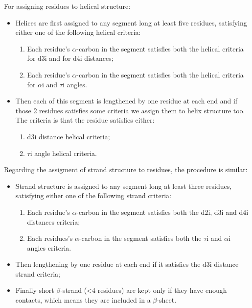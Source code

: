 For assigning residues to helical structure:
\begin{itemize}
    \item Helices are first assigned to any segment long at least five residues, satisfying either one of the following helical criteria:
        \begin{enumerate}
            \item Each residue's $\alpha$-carbon in the segment satisfies both the helical criteria for d3i and for d4i distances;
            \item Each residue's $\alpha$-carbon in the segment satisfies both the helical criteria for $\alpha$i and $\tau$i angles.
        \end{enumerate}
    \item Then each of this segment is lengthened by one residue at each end and if those 2 residues satisfies some criteria we assign them to helix structure too. The criteria is that the residue satisfies either:
    \begin{enumerate}
        \item d3i distance helical criteria;
        \item $\tau$i angle helical criteria.
    \end{enumerate}
\end{itemize} 
Regarding the assigment of strand structure to residues, the procedure is similar:
\begin{itemize}
    \item Strand structure is assigned to any segment long at least three residues, satisfying either one of the following strand criteria:
    \begin{enumerate}
        \item Each residue's $\alpha$-carbon in the segment satisfies both the d2i, d3i and d4i distances criteria; 
        \item Each residues's $\alpha$-carbon in the segment satisfies both the $\tau$i and $\alpha$i angles criteria.
    \end{enumerate}
    \item Then lengthening by one residue at each end if it satisfies the d3i distance strand criteria;
    \item Finally short $\beta$-strand (<4 residues) are kept only if they have enough contacts, which means they are included in a $\beta$-sheet.
\end{itemize}

